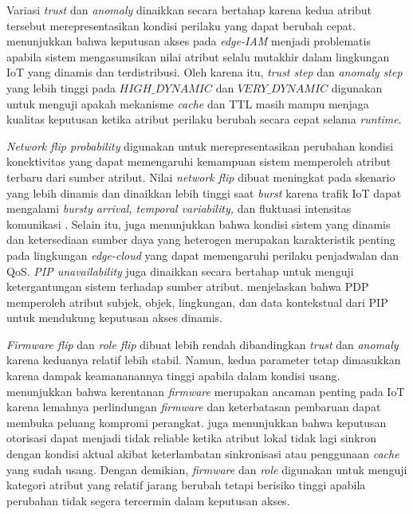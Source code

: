 Variasi \textit{trust} dan \textit{anomaly} dinaikkan secara bertahap karena kedua atribut tersebut merepresentasikan kondisi perilaku yang dapat berubah cepat. \textcite{wang_edge-enabled_2025} menunjukkan bahwa keputusan akses pada \textit{edge-IAM} menjadi problematis apabila sistem mengasumsikan nilai atribut selalu mutakhir dalam lingkungan IoT yang dinamis dan terdistribusi. Oleh karena itu, \textit{trust step} dan \textit{anomaly step} yang lebih tinggi pada $HIGH\_DYNAMIC$ dan $VERY\_DYNAMIC$ digunakan untuk menguji apakah mekanisme \textit{cache} dan TTL masih mampu menjaga kualitas keputusan ketika atribut perilaku berubah secara cepat selama \textit{runtime}.

\textit{Network flip probability} digunakan untuk merepresentasikan perubahan kondisi konektivitas yang dapat memengaruhi kemampuan sistem memperoleh atribut terbaru dari sumber atribut. Nilai \textit{network flip} dibuat meningkat pada skenario yang lebih dinamis dan dinaikkan lebih tinggi saat \textit{burst} karena trafik IoT dapat mengalami \textit{bursty arrival, temporal variability,} dan fluktuasi intensitas komunikasi \parencite{kovtun_stochastic_2025}. Selain itu, \textcite{raju_intellischeduler_2026} juga menunjukkan bahwa kondisi sistem yang dinamis dan ketersediaan sumber daya yang heterogen merupakan karakteristik penting pada lingkungan \textit{edge-cloud} yang dapat memengaruhi perilaku penjadwalan dan QoS. \textit{PIP unavailability} juga dinaikkan secara bertahap untuk menguji ketergantungan sistem terhadap sumber atribut. \textcite{mao_zero-trust_2025} menjelaskan bahwa PDP memperoleh atribut subjek, objek, lingkungan, dan data kontekstual dari PIP untuk mendukung keputusan akses dinamis.

\textit{Firmware flip} dan \textit{role flip} dibuat lebih rendah dibandingkan \textit{trust} dan \textit{anomaly} karena keduanya relatif lebih stabil. Namun, kedua parameter tetap dimasukkan karena dampak keamananannya tinggi apabila dalam kondisi usang. \textcite{bakhshi_review_2024} menunjukkan bahwa kerentanan \textit{firmware} merupakan ancaman penting pada IoT karena lemahnya perlindungan \textit{firmware} dan keterbatasan pembaruan dapat membuka peluang kompromi perangkat. \textcite{wang_edge-enabled_2025} juga menunjukkan bahwa keputusan otorisasi dapat menjadi tidak reliable ketika atribut lokal tidak lagi sinkron dengan kondisi aktual akibat keterlambatan sinkronisasi atau penggunaan \textit{cache} yang sudah usang. Dengan demikian, \textit{firmware} dan \textit{role} digunakan untuk menguji kategori atribut yang relatif jarang berubah tetapi berisiko tinggi apabila perubahan tidak segera tercermin dalam keputusan akses.

